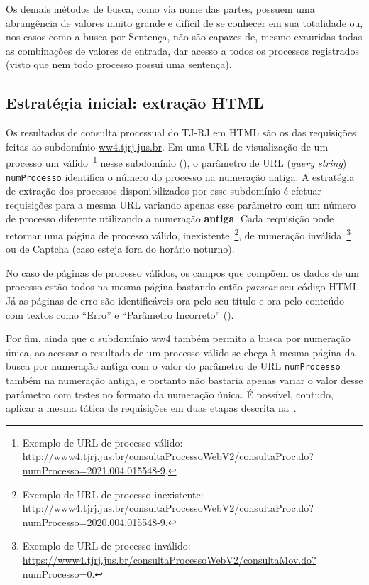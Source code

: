 Os demais métodos de busca, como via nome das partes, possuem uma abrangência
de valores muito grande e difícil de se conhecer em sua totalidade ou, nos
casos como a busca por Sentença, não são capazes de, mesmo exauridas todas as
combinações de valores de entrada, dar acesso a todos os processos registrados
(visto que nem todo processo possui uma sentença).

\subsection{Estratégia inicial: extração HTML}

Os resultados de consulta processual do TJ-RJ em HTML são os das requisições
feitas ao subdomínio \url{ww4.tjrj.jus.br}. Em uma URL de visualização de um
processo um válido~\footnote{Exemplo de URL de processo válido:
\url{http://www4.tjrj.jus.br/consultaProcessoWebV2/consultaProc.do?numProcesso=2021.004.015548-9}.}
nesse subdomínio (), o parâmetro de URL
(\textit{query string}) \texttt{numProcesso} identifica o número do processo na
numeração antiga. A estratégia de extração dos processos disponibilizados por
esse subdomínio é efetuar requisições para a mesma URL variando apenas esse
parâmetro com um número de processo diferente utilizando a numeração
\textbf{antiga}. Cada requisição pode retornar uma página de processo válido,
inexistente~\footnote{Exemplo de URL de processo inexistente:
\url{http://www4.tjrj.jus.br/consultaProcessoWebV2/consultaProc.do?numProcesso=2020.004.015548-9}.},
de numeração inválida~\footnote{Exemplo de URL de processo inválido:
\url{https://www4.tjrj.jus.br/consultaProcessoWebV2/consultaMov.do?numProcesso=0}.}
ou de Captcha (caso esteja fora do horário noturno).

No caso de páginas de processo válidos, os campos que compõem os dados de um
processo estão todos na mesma página bastando então \textit{parsear} seu código
HTML. Já as páginas de erro são identificáveis ora pelo seu título e ora pelo
conteúdo com textos como ``Erro'' e ``Parâmetro Incorreto''
().

Por fim, ainda que o subdomínio ww4 também permita a busca por numeração única,
ao acessar o resultado de um processo válido se chega à mesma página da busca
por numeração antiga com o valor do parâmetro de URL \texttt{numProcesso}
também na numeração antiga, e portanto não bastaria apenas variar o valor desse
parâmetro com testes no formato da numeração única. É possível, contudo,
aplicar a mesma tática de requisições em duas etapas descrita
na~.

